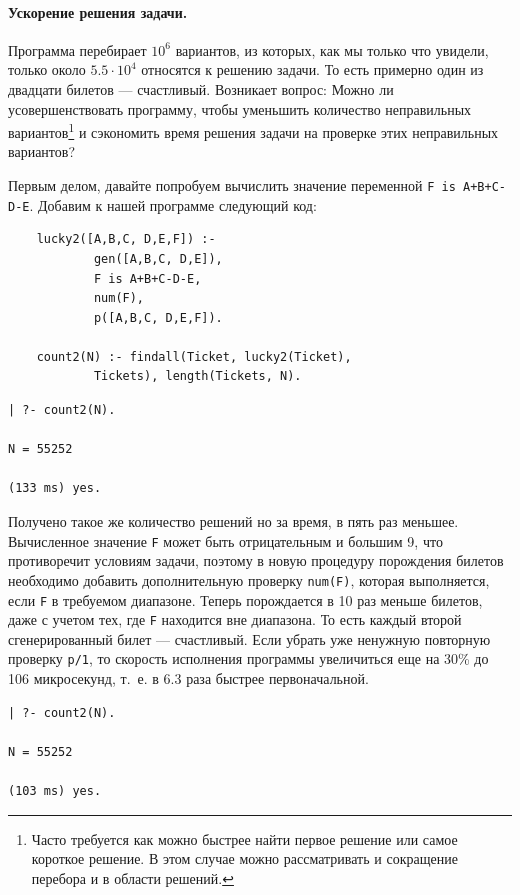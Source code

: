 \documentclass[12pt, openany, twoside]{book} %
\begin{document}
\paragraph{Ускорение решения задачи.} Программа перебирает $10^6$ вариантов, из которых, как мы только что увидели, только около $5.5\cdot 10^4$ относятся к решению задачи. То есть примерно один из двадцати билетов --- счастливый. Возникает вопрос: Можно ли усовершенствовать программу, чтобы уменьшить количество неправильных вариантов\footnote{Часто требуется как можно быстрее найти первое решение или самое короткое решение. В этом случае можно рассматривать и сокращение перебора и в области решений.} и сэкономить время решения задачи на проверке этих неправильных вариантов?

Первым делом, давайте попробуем вычислить значение переменной \texttt{F is A+B+C-D-E}. Добавим к нашей программе следующий код:
{\tt\begin{verbatim}
    lucky2([A,B,C, D,E,F]) :-
            gen([A,B,C, D,E]),
            F is A+B+C-D-E,
            num(F),
            p([A,B,C, D,E,F]).

    count2(N) :- findall(Ticket, lucky2(Ticket),
            Tickets), length(Tickets, N).
\end{verbatim}}
{\tt\begin{verbatim}
| ?- count2(N).

N = 55252

(133 ms) yes.
\end{verbatim}}

\noindent{}Получено такое же количество решений но за время, в пять раз меньшее. Вычисленное значение \texttt{F} может быть отрицательным и большим 9, что противоречит условиям задачи, поэтому в новую процедуру порождения билетов необходимо добавить дополнительную проверку \texttt{num(F)}, которая выполняется, если \texttt{F} в требуемом диапазоне. Теперь порождается в 10 раз меньше билетов, даже с учетом тех, где \texttt{F} находится вне диапазона. То есть каждый второй сгенерированный билет --- счастливый.  Если убрать уже ненужную повторную проверку \texttt{p/1}, то скорость исполнения программы увеличиться еще на 30\% до 106 микросекунд, т.~е. в 6.3 раза быстрее первоначальной.
{\tt\begin{verbatim}
| ?- count2(N).

N = 55252

(103 ms) yes.
\end{verbatim}}
\end{document}
